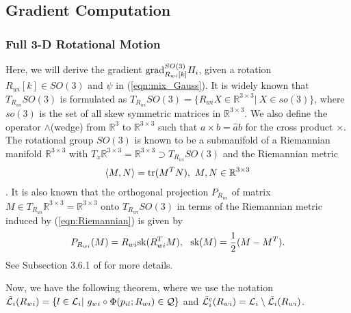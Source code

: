 \documentclass[conference,letterpaper]{ieeeconf}
\newcommand{\grad}{{\rm grad}}
\newcommand{\Q}{{\mathcal Q}}
\newcommand{\R}{{\mathbb R}}
\newcommand{\tr}{{\rm tr}}
\newcommand{\sk}{{\rm sk}}
\newcommand{\ewi}{R_{wi}}
\renewcommand{\L}{{\cal L}}
\newcommand{\TSO}{T_{\ewi}SO(3)}
\begin{document}
\subsection{Gradient Computation}



\subsubsection*{Full 3-D Rotational Motion}



Here, we will derive the gradient $\grad_{\ewi[k]}^{SO(3)} H_i$, given a rotation $\ewi[k] \in SO(3)$ and $\psi$ in (\ref{eqn:mix_Gauss}).
It is widely known that $\TSO$ is formulated as
$\TSO = \{\ewi X \in \R^{3\times 3}|\ X \in so(3)\}$,
where $so(3)$ is the set of all skew symmetric matrices in $\R^{3\times 3}$.
We also define the operator $\wedge$(wedge) from $\R^3$ to $\R^{3\times 3}$
such that $a \times b = \hat a b$ for the cross product $\times$.
The rotational group $SO(3)$ is known to be a submanifold of
a Riemannian manifold $\R^{3 \times 3}$ with 
$T_x\R^{3\times 3} = \R^{3\times 3} \supset \TSO$
and the Riemannian metric 
\begin{eqnarray}
\langle M, N \rangle = \tr(M^TN),\ M, N\in \R^{3\times 3}
\label{eqn:Riemannian}
\end{eqnarray}
\cite{AMS_BK}.
It is also known that
the orthogonal projection $P_{\ewi}$ of matrix
$M \in T_{\ewi}\R^{3\times 3} = \R^{3\times 3}$ onto $\TSO$ 
in terms of the Riemannian metric induced by (\ref{eqn:Riemannian})
is given by
\begin{eqnarray}
P_{\ewi}(M) = \ewi\sk(\ewi^T M),\ \ \sk(M) = \frac{1}{2}(M - M^T).
\label{eqn:proj_so(3)}
\end{eqnarray}
See Subsection 3.6.1 of \cite{AMS_BK} for more details.











Now, we have the following theorem, where we use the notation
$\tilde \L_i(\ewi) = \{l \in \L_i|\ g_{wi} \circ \Phi(p_{il};\ewi) \in \Q\}$
and $\tilde \L_i^c(\ewi) = \L_i \setminus \tilde \L_i(\ewi)$.
\end{document}
